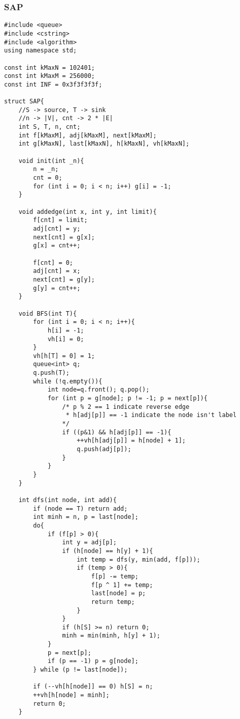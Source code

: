 \subsubsection{SAP}
\begin{verbatim}
#include <queue>
#include <cstring>
#include <algorithm>
using namespace std;

const int kMaxN = 102401;
const int kMaxM = 256000;
const int INF = 0x3f3f3f3f;

struct SAP{
    //S -> source, T -> sink 
    //n -> |V|, cnt -> 2 * |E|
    int S, T, n, cnt;
    int f[kMaxM], adj[kMaxM], next[kMaxM];
    int g[kMaxN], last[kMaxN], h[kMaxN], vh[kMaxN];

    void init(int _n){
        n = _n;
        cnt = 0;
        for (int i = 0; i < n; i++) g[i] = -1;
    }

    void addedge(int x, int y, int limit){
        f[cnt] = limit;
        adj[cnt] = y;
        next[cnt] = g[x];
        g[x] = cnt++;

        f[cnt] = 0;
        adj[cnt] = x;
        next[cnt] = g[y];
        g[y] = cnt++;
    }

    void BFS(int T){
        for (int i = 0; i < n; i++){
            h[i] = -1;
            vh[i] = 0;
        }
        vh[h[T] = 0] = 1;
        queue<int> q;
        q.push(T);
        while (!q.empty()){
            int node=q.front(); q.pop();
            for (int p = g[node]; p != -1; p = next[p]){
                /* p % 2 == 1 indicate reverse edge
                 * h[adj[p]] == -1 indicate the node isn't label
                */
                if ((p&1) && h[adj[p]] == -1){ 
                    ++vh[h[adj[p]] = h[node] + 1];
                    q.push(adj[p]);
                }
            }
        }
    }

    int dfs(int node, int add){
        if (node == T) return add;
        int minh = n, p = last[node];
        do{
            if (f[p] > 0){
                int y = adj[p];
                if (h[node] == h[y] + 1){
                    int temp = dfs(y, min(add, f[p]));
                    if (temp > 0){
                        f[p] -= temp;
                        f[p ^ 1] += temp;
                        last[node] = p;
                        return temp;
                    }
                }
                if (h[S] >= n) return 0;
                minh = min(minh, h[y] + 1);
            }
            p = next[p];
            if (p == -1) p = g[node];
        } while (p != last[node]);

        if (--vh[h[node]] == 0) h[S] = n;
        ++vh[h[node] = minh];
        return 0;
    }


\end{verbatim}
